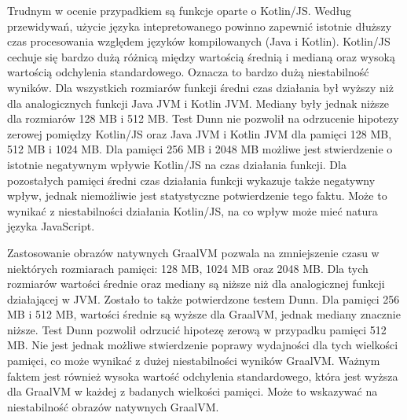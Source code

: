 Trudnym w ocenie przypadkiem są funkcje oparte o Kotlin/JS.
Według przewidywań, użycie języka intepretowanego powinno zapewnić istotnie dłuższy czas procesowania względem języków kompilowanych (Java i Kotlin).
Kotlin/JS cechuje się bardzo dużą różnicą między wartością średnią i medianą oraz wysoką wartością odchylenia standardowego.
Oznacza to bardzo dużą niestabilność wyników.
Dla wszystkich rozmiarów funkcji średni czas działania był wyższy niż dla analogicznych funkcji Java JVM i Kotlin JVM.
Mediany były jednak niższe dla rozmiarów 128 MB i 512 MB.
Test Dunn nie pozwolił na odrzucenie hipotezy zerowej pomiędzy Kotlin/JS oraz Java JVM i Kotlin JVM dla pamięci 128 MB, 512 MB i 1024 MB.
Dla pamięci 256 MB i 2048 MB możliwe jest stwierdzenie o istotnie negatywnym wpływie Kotlin/JS na czas działania funkcji.
Dla pozostałych pamięci średni czas działania funkcji wykazuje także negatywny wpływ, jednak niemożliwie jest statystyczne potwierdzenie tego faktu.
Może to wynikać z niestabilności działania Kotlin/JS, na co wpływ może mieć natura języka JavaScript.

Zastosowanie obrazów natywnych GraalVM pozwala na zmniejszenie czasu w niektórych rozmiarach pamięci: 128 MB, 1024 MB oraz 2048 MB.
Dla tych rozmiarów wartości średnie oraz mediany są niższe niż dla analogicznej funkcji działającej w JVM.
Zostało to także potwierdzone testem Dunn.
Dla pamięci 256 MB i 512 MB, wartości średnie są wyższe dla GraalVM, jednak mediany znacznie niższe.
Test Dunn pozwolił odrzucić hipotezę zerową w przypadku pamięci 512 MB.
Nie jest jednak możliwe stwierdzenie poprawy wydajności dla tych wielkości pamięci, co może wynikać z dużej niestabilności wyników GraalVM.
Ważnym faktem jest również wysoka wartość odchylenia standardowego, która jest wyższa dla GraalVM w każdej z badanych wielkości pamięci.
Może to wskazywać na niestabilność obrazów natywnych GraalVM.

